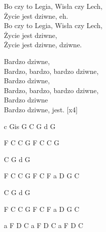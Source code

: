 \begin{text}
Bo czy to Legia, Wisła czy Lech,\\
Życie jest dziwne, eh.\\
Bo czy to Legia, Wisła czy Lech,\\
Życie jest dziwne,\\
Życie jest dziwne, dziwne.

Bardzo dziwne,\\
Bardzo, bardzo, bardzo dziwne,\\
Bardzo dziwne,\\
Bardzo, bardzo, bardzo dziwne,\\
Bardzo dziwne\\
Bardzo dziwne, jest. [x4]
\end{text}
\begin{chord}
c Gis G
C
G
d
G

F C
C G
F C
C G

C
G
d
G

F C
C G
F C
F a D G C

C
G
d
G

F C
C G
F C
F a D G C

a 
F D C
a 
F D C 
a 
F D C 
\end{chord}